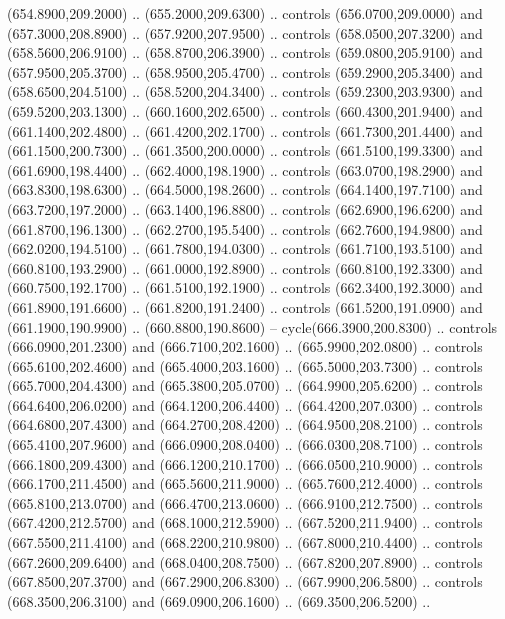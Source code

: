 {\begin{scope}[y=0.80pt, x=0.80pt, yscale=-1, xscale=1, inner sep=0pt, outer sep=0pt, #1]
      (654.8900,209.2000) .. (655.2000,209.6300) .. controls (656.0700,209.0000) and
      (657.3000,208.8900) .. (657.9200,207.9500) .. controls (658.0500,207.3200) and
      (658.5600,206.9100) .. (658.8700,206.3900) .. controls (659.0800,205.9100) and
      (657.9500,205.3700) .. (658.9500,205.4700) .. controls (659.2900,205.3400) and
      (658.6500,204.5100) .. (658.5200,204.3400) .. controls (659.2300,203.9300) and
      (659.5200,203.1300) .. (660.1600,202.6500) .. controls (660.4300,201.9400) and
      (661.1400,202.4800) .. (661.4200,202.1700) .. controls (661.7300,201.4400) and
      (661.1500,200.7300) .. (661.3500,200.0000) .. controls (661.5100,199.3300) and
      (661.6900,198.4400) .. (662.4000,198.1900) .. controls (663.0700,198.2900) and
      (663.8300,198.6300) .. (664.5000,198.2600) .. controls (664.1400,197.7100) and
      (663.7200,197.2000) .. (663.1400,196.8800) .. controls (662.6900,196.6200) and
      (661.8700,196.1300) .. (662.2700,195.5400) .. controls (662.7600,194.9800) and
      (662.0200,194.5100) .. (661.7800,194.0300) .. controls (661.7100,193.5100) and
      (660.8100,193.2900) .. (661.0000,192.8900) .. controls (660.8100,192.3300) and
      (660.7500,192.1700) .. (661.5100,192.1900) .. controls (662.3400,192.3000) and
      (661.8900,191.6600) .. (661.8200,191.2400) .. controls (661.5200,191.0900) and
      (661.1900,190.9900) .. (660.8800,190.8600) -- cycle(666.3900,200.8300) ..
      controls (666.0900,201.2300) and (666.7100,202.1600) .. (665.9900,202.0800) ..
      controls (665.6100,202.4600) and (665.4000,203.1600) .. (665.5000,203.7300) ..
      controls (665.7000,204.4300) and (665.3800,205.0700) .. (664.9900,205.6200) ..
      controls (664.6400,206.0200) and (664.1200,206.4400) .. (664.4200,207.0300) ..
      controls (664.6800,207.4300) and (664.2700,208.4200) .. (664.9500,208.2100) ..
      controls (665.4100,207.9600) and (666.0900,208.0400) .. (666.0300,208.7100) ..
      controls (666.1800,209.4300) and (666.1200,210.1700) .. (666.0500,210.9000) ..
      controls (666.1700,211.4500) and (665.5600,211.9000) .. (665.7600,212.4000) ..
      controls (665.8100,213.0700) and (666.4700,213.0600) .. (666.9100,212.7500) ..
      controls (667.4200,212.5700) and (668.1000,212.5900) .. (667.5200,211.9400) ..
      controls (667.5500,211.4100) and (668.2200,210.9800) .. (667.8000,210.4400) ..
      controls (667.2600,209.6400) and (668.0400,208.7500) .. (667.8200,207.8900) ..
      controls (667.8500,207.3700) and (667.2900,206.8300) .. (667.9900,206.5800) ..
      controls (668.3500,206.3100) and (669.0900,206.1600) .. (669.3500,206.5200) ..

\end{scope}}
